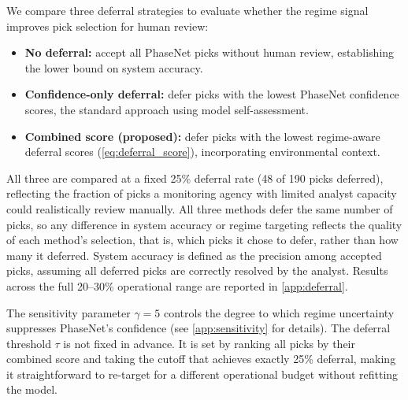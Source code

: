 We compare three deferral strategies to evaluate whether the regime signal improves pick selection for human review:
\setlength{\itemsep}{0pt}
\setlength{\parskip}{0pt}
\begin{itemize}
    \setlength{\itemsep}{0pt}
    \setlength{\parskip}{0pt}
    \item \textbf{No deferral:} accept all PhaseNet picks without human review, 
    establishing the lower bound on system accuracy.
    \item \textbf{Confidence-only deferral:} defer picks with the lowest PhaseNet 
    confidence scores, the standard approach using model self-assessment.
    \item \textbf{Combined score (proposed):} defer picks with the lowest regime-aware 
    deferral scores (\cref{eq:deferral_score}), incorporating environmental context.
\end{itemize}

All three are compared at a fixed 25\% deferral rate (48 of 190 picks deferred), reflecting the fraction of picks a monitoring agency with limited analyst capacity 
could realistically review manually. All three methods defer the same number of picks, so any difference in system accuracy or regime targeting reflects the quality of each method's selection, that is, which picks it chose to defer, rather than how many it deferred. System accuracy is defined as the precision among accepted picks, assuming all deferred picks are correctly resolved by the analyst. Results across the full 20--30\% operational range are reported in \cref{app:deferral}.

\medskip
The sensitivity parameter $\gamma = 5$ controls the degree to which regime uncertainty suppresses PhaseNet's confidence (see \cref{app:sensitivity} for details). The deferral threshold $\tau$ is not fixed in advance. It is set by ranking all picks by their combined score and taking the cutoff that achieves exactly 25\% deferral, making it straightforward to re-target for a different operational budget without refitting 
the model.
